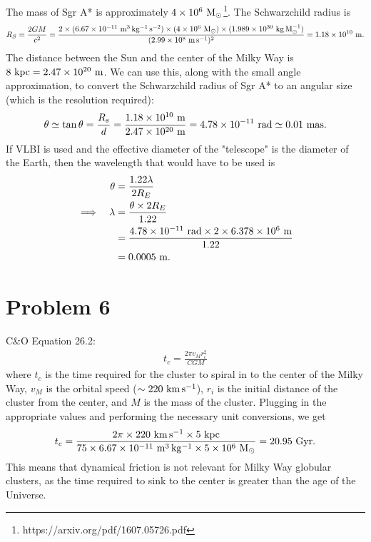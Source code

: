 \documentclass[11pt,letterpaper]{article}
\begin{document}
The mass of Sgr A* is approximately $4\times 10^{6}~{\rm M_\odot}$\footnote{https://arxiv.org/pdf/1607.05726.pdf}. The Schwarzchild radius is
\begin{align*}
    R_S = \frac{2GM}{c^2} = \frac{2\times (6.67\times 10^{-11}~{\rm m^3\,kg^{-1}\,s^{-2}})\times (4\times 10^{6}~{\rm M_\odot})\times (1.989\times 10^{30}~{\rm kg\,M_\odot^{-1}})}{(2.99\times 10^{8}~{\rm m\,s^{-1}})^2} = 1.18\times 10^{10}~{\rm m}.
\end{align*}
The distance between the Sun and the center of the Milky Way is $8~{\rm kpc} = 2.47\times 10^{20}~{\rm m}$. We can use this, along with the small angle approximation, to convert the Schwarzchild radius of Sgr A* to an angular size (which is the resolution required):
\begin{align*}
    \theta \simeq \tan{\theta} = \frac{R_s}{d} = \frac{1.18\times 10^{10}~{\rm m}}{2.47\times 10^{20}~{\rm m}} = 4.78\times 10^{-11}~{\rm rad} \simeq 0.01~{\rm mas}. 
\end{align*}
If VLBI is used and the effective diameter of the "telescope" is the diameter of the Earth, then the wavelength that would have to be used is 
\begin{alignat*}{2}
    &&\theta &= \frac{1.22\lambda}{2R_E} \\
    \implies&&\lambda &= \frac{\theta \times 2R_E}{1.22} \\
    &&&= \frac{4.78\times 10^{-11}~{\rm rad}\times 2\times 6.378\times 10^{6}~{\rm m}}{1.22} \\
    &&&= 0.0005~{\rm m}.
\end{alignat*}


\section*{Problem 6}

C\&O Equation 26.2:
\begin{align*}
    t_c = \frac{2\pi v_M r_i^2}{CGM}
\end{align*}
where $t_c$ is the time required for the cluster to spiral in to the center of the Milky Way, $v_M$ is the orbital speed ($\sim 220~{\rm km\,s^{-1}}$), $r_i$ is the initial distance of the cluster from the center, and $M$ is the mass of the cluster. Plugging in the appropriate values and performing the necessary unit conversions, we get 
\begin{align*}
    t_c = \frac{2\pi \times 220~{\rm km\,s^{-1}}\times 5~{\rm kpc}}{75\times 6.67\times 10^{-11}~{\rm m^3\,kg^{-1}}\times 5\times 10^{6}~{\rm M_\odot}} = 20.95~{\rm Gyr}.
\end{align*}
This means that dynamical friction is not relevant for Milky Way globular clusters, as the time required to sink to the center is greater than the age of the Universe. 
\end{document}
